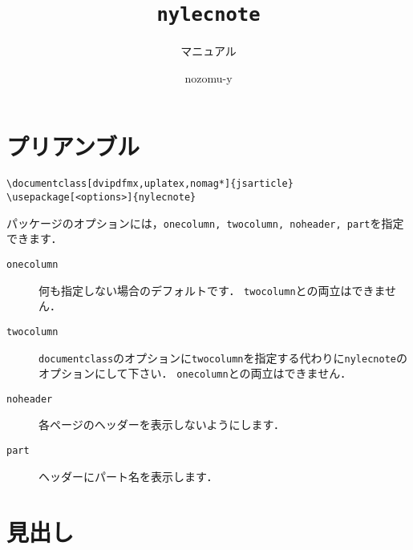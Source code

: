 \documentclass[dvipdfmx,uplatex,b5j,8pt,nomag*]{jsarticle}
\title{{\tt nylecnote}}
\subtitle{マニュアル}
\author{nozomu-y}
\begin{document}
\maketitle
\tableofcontents
\newpage

\section{プリアンブル}
\begin{lstlisting}
\documentclass[dvipdfmx,uplatex,nomag*]{jsarticle}
\usepackage[<options>]{nylecnote}
\end{lstlisting}

パッケージのオプションには，{\tt onecolumn, twocolumn, noheader, part}を指定できます．
\begin{description}
    \item[{\tt onecolumn}] 何も指定しない場合のデフォルトです．
        {\tt twocolumn}との両立はできません．
    \item[{\tt twocolumn}] {\tt documentclass}のオプションに{\tt twocolumn}を指定する代わりに{\tt nylecnote}のオプションにして下さい．
        {\tt onecolumn}との両立はできません．
    \item[{\tt noheader}] 各ページのヘッダーを表示しないようにします．
    \item[{\tt part}] ヘッダーにパート名を表示します．
\end{description}

\section{見出し}
\end{document}
